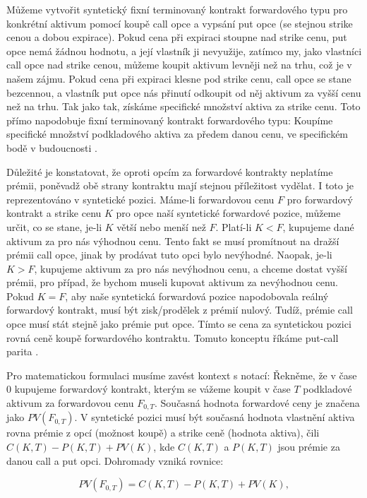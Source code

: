 \documentclass[male,czech,api_bc]{kitheses}
\begin{document}
  Můžeme vytvořit syntetický fixní terminovaný kontrakt forwardového typu pro konkrétní aktivum pomocí koupě call opce a vypsání put opce (se stejnou strike cenou a dobou expirace). Pokud cena při expiraci stoupne nad strike cenu, put opce nemá žádnou hodnotu, a její vlastník ji nevyužije, zatímco my, jako vlastníci call opce nad strike cenou, můžeme koupit aktivum levněji než na trhu, což je v našem zájmu. Pokud cena při expiraci klesne pod strike cenu, call opce se stane bezcennou, a vlastník put opce nás přinutí odkoupit od něj aktivum za vyšší cenu než na trhu. Tak jako tak, získáme specifické množství aktiva za strike cenu. Toto přímo napodobuje fixní terminovaný kontrakt forwardového typu: Koupíme specifické množství podkladového aktiva za předem danou cenu, ve specifickém bodě v budoucnosti \parencites[s.~82-84]{McDonald2013}. 

  Důležité je konstatovat, že oproti opcím za forwardové kontrakty neplatíme prémii, poněvadž obě strany kontraktu mají stejnou příležitost vydělat. I toto je reprezentováno v syntetické pozici. Máme-li forwardovou cenu $F$ pro forwardový kontrakt a strike cenu $K$ pro opce naší syntetické forwardové pozice, můžeme určit, co se stane, je-li $K$ větší nebo menší než $F$. Platí-li $K < F$, kupujeme dané aktivum za pro nás výhodnou cenu. Tento fakt se musí promítnout na dražší prémii call opce, jinak by prodávat tuto opci bylo nevýhodné. Naopak, je-li $K > F$, kupujeme aktivum za pro nás nevýhodnou cenu, a chceme dostat vyšší prémii, pro případ, že bychom museli kupovat aktivum za nevýhodnou cenu. Pokud $K = F$, aby naše syntetická forwardová pozice napodobovala reálný forwardový kontrakt, musí být zisk/prodělek z prémií nulový. Tudíž, prémie call opce musí stát stejně jako prémie put opce. Tímto se cena za syntetickou pozici rovná ceně koupě forwardového kontraktu. Tomuto konceptu říkáme put-call parita \parencites[s.~82-85]{McDonald2013}[kapitola~2.12]{Wilmott2006}.

  Pro matematickou formulaci musíme zavést kontext s notací: Řekněme, že v čase 0 kupujeme forwardový kontrakt, kterým se vážeme koupit v čase $T$ podkladové aktivum za forwardovou cenu $F_{0, T}$. Současná hodnota forwardové ceny je značena jako $PV(F_{0, T})$. V syntetické pozici musí být současná hodnota vlastnění aktiva rovna prémie z opcí (možnost koupě) a strike ceně (hodnota aktiva), čili $C(K, T) - P(K, T) + PV(K)$, kde $C(K, T)$ a $P(K, T)$ jsou prémie za danou call a put opci. Dohromady vzniká rovnice: 

  \begin{equation}
    PV(F_{0, T}) = C(K, T) - P(K, T) + PV(K),
    \label{eq:rn_first}
  \end{equation}
\end{document}
